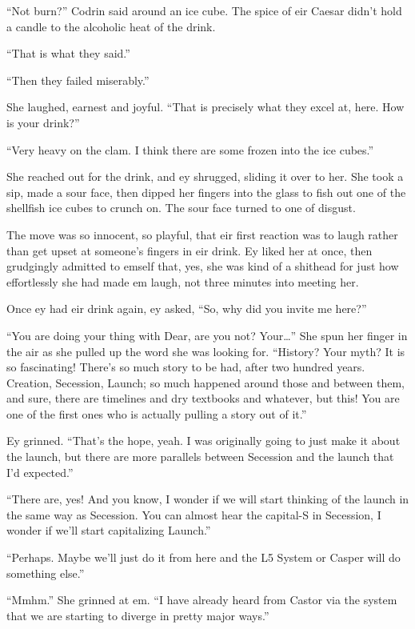 ``Not burn?'' Codrin said around an ice cube. The spice of eir Caesar didn't hold a candle to the alcoholic heat of the drink.

``That is what they said.''

``Then they failed miserably.''

She laughed, earnest and joyful. ``That is precisely what they excel at, here. How is your drink?''

``Very heavy on the clam. I think there are some frozen into the ice cubes.''

She reached out for the drink, and ey shrugged, sliding it over to her. She took a sip, made a sour face, then dipped her fingers into the glass to fish out one of the shellfish ice cubes to crunch on. The sour face turned to one of disgust.

The move was so innocent, so playful, that eir first reaction was to laugh rather than get upset at someone's fingers in eir drink. Ey liked her at once, then grudgingly admitted to emself that, yes, she was kind of a shithead for just how effortlessly she had made em laugh, not three minutes into meeting her.

Once ey had eir drink again, ey asked, ``So, why did you invite me here?''

``You are doing your thing with Dear, are you not? Your\ldots{}'' She spun her finger in the air as she pulled up the word she was looking for. ``History? Your myth? It is so fascinating! There's so much story to be had, after two hundred years. Creation, Secession, Launch; so much happened around those and between them, and sure, there are timelines and dry textbooks and whatever, but this! You are one of the first ones who is actually pulling a story out of it.''

Ey grinned. ``That's the hope, yeah. I was originally going to just make it about the launch, but there are more parallels between Secession and the launch that I'd expected.''

``There are, yes! And you know, I wonder if we will start thinking of the launch in the same way as Secession. You can almost hear the capital-S in Secession, I wonder if we'll start capitalizing Launch.''

``Perhaps. Maybe we'll just do it from here and the L5 System or Casper will do something else.''

``Mmhm.'' She grinned at em. ``I have already heard from Castor via the system that we are starting to diverge in pretty major ways.''

